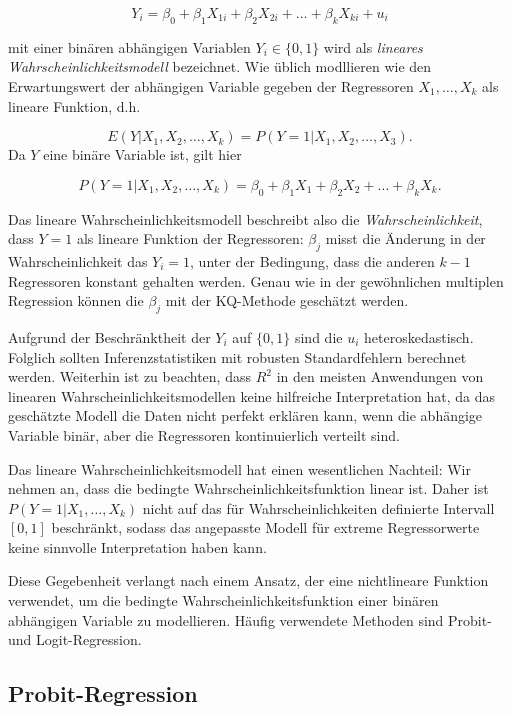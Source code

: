 \documentclass[
  a4paper,
  DIV=11,
  oneside]{scrreprt}
\begin{document}
\[Y_i = \beta_0 + \beta_1 X_{1i} + \beta_2 X_{2i} + \dots + \beta_k X_{ki} + u_i\]

mit einer binären abhängigen Variablen \(Y_i\in\{0,1\}\) wird als
\emph{lineares Wahrscheinlichkeitsmodell} bezeichnet. Wie üblich
modllieren wie den Erwartungswert der abhängigen Variable gegeben der
Regressoren \(X_1,\dots,X_k\) als lineare Funktion, d.h.

\[E(Y\vert X_1,X_2,\dots,X_k) = P(Y=1\vert X_1, X_2,\dots, X_3).\] Da
\(Y\) eine binäre Variable ist, gilt hier

\[ P(Y = 1 \vert X_1, X_2, \dots, X_k) = \beta_0 + \beta_1 X_1 + \beta_2 X_2 + \dots + \beta_k X_k.\]

Das lineare Wahrscheinlichkeitsmodell beschreibt also die
\emph{Wahrscheinlichkeit}, dass \(Y=1\) als lineare Funktion der
Regressoren: \(\beta_j\) misst die Änderung in der Wahrscheinlichkeit
das \(Y_i=1\), unter der Bedingung, dass die anderen \(k-1\) Regressoren
konstant gehalten werden. Genau wie in der gewöhnlichen multiplen
Regression können die \(\beta_j\) mit der KQ-Methode geschätzt werden.

Aufgrund der Beschränktheit der \(Y_i\) auf \(\{0,1\}\) sind die \(u_i\)
heteroskedastisch. Folglich sollten Inferenzstatistiken mit robusten
Standardfehlern berechnet werden. Weiterhin ist zu beachten, dass
\(R^2\) in den meisten Anwendungen von linearen
Wahrscheinlichkeitsmodellen keine hilfreiche Interpretation hat, da das
geschätzte Modell die Daten nicht perfekt erklären kann, wenn die
abhängige Variable binär, aber die Regressoren kontinuierlich verteilt
sind.

Das lineare Wahrscheinlichkeitsmodell hat einen wesentlichen Nachteil:
Wir nehmen an, dass die bedingte Wahrscheinlichkeitsfunktion linear ist.
Daher ist \(P(Y=1\vert X_1,\dots,X_k)\) nicht auf das für
Wahrscheinlichkeiten definierte Intervall \([0,1]\) beschränkt, sodass
das angepasste Modell für extreme Regressorwerte keine sinnvolle
Interpretation haben kann.

Diese Gegebenheit verlangt nach einem Ansatz, der eine nichtlineare
Funktion verwendet, um die bedingte Wahrscheinlichkeitsfunktion einer
binären abhängigen Variable zu modellieren. Häufig verwendete Methoden
sind Probit- und Logit-Regression.

\subsection{Probit-Regression}\label{probit-regression}
\end{document}
